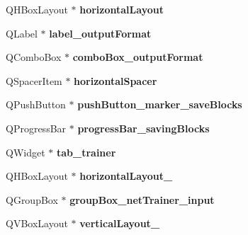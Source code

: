 \begin{DoxyCompactItemize}
\item 
\mbox{\label{class_ui___main_window_acd6fdc9ebacc4b25b834162380d75ce8}} 
Q\+H\+Box\+Layout $\ast$ {\bfseries horizontal\+Layout}
\item 
\mbox{\label{class_ui___main_window_aefb7fb35676cd49082797f122f1142cb}} 
Q\+Label $\ast$ {\bfseries label\+\_\+output\+Format}
\item 
\mbox{\label{class_ui___main_window_a57e65c8a7085966036b9e78ea0b4e985}} 
Q\+Combo\+Box $\ast$ {\bfseries combo\+Box\+\_\+output\+Format}
\item 
\mbox{\label{class_ui___main_window_a7871ea8c4b6c595d7ccd53960b344719}} 
Q\+Spacer\+Item $\ast$ {\bfseries horizontal\+Spacer}
\item 
\mbox{\label{class_ui___main_window_a62389d1506d8015d68bae2b407a730a4}} 
Q\+Push\+Button $\ast$ {\bfseries push\+Button\+\_\+marker\+\_\+save\+Blocks}
\item 
\mbox{\label{class_ui___main_window_a3a3c14619fe22a831d9c5f7cb6814bdd}} 
Q\+Progress\+Bar $\ast$ {\bfseries progress\+Bar\+\_\+saving\+Blocks}
\item 
\mbox{\label{class_ui___main_window_a049ae8357f3382a1808422edf17a8614}} 
Q\+Widget $\ast$ {\bfseries tab\+\_\+trainer}
\item 
\mbox{\label{class_ui___main_window_a186648a8727e70d96e4e7b2b58508dc6}} 
Q\+H\+Box\+Layout $\ast$ {\bfseries horizontal\+Layout\+\_}
\item 
\mbox{\label{class_ui___main_window_ab6d29466465777352baeebaf2a1acd80}} 
Q\+Group\+Box $\ast$ {\bfseries group\+Box\+\_\+net\+Trainer\+\_\+input}
\item 
\mbox{\label{class_ui___main_window_a22115df48ffb70e4c1386c3a6f0c2bdb}} 
Q\+V\+Box\+Layout $\ast$ {\bfseries vertical\+Layout\+\_}
\item 
\mbox{\label{class_ui___main_window_a024ff4e7726e038b7577002dccbf2db8}} 

\end{DoxyCompactItemize}
